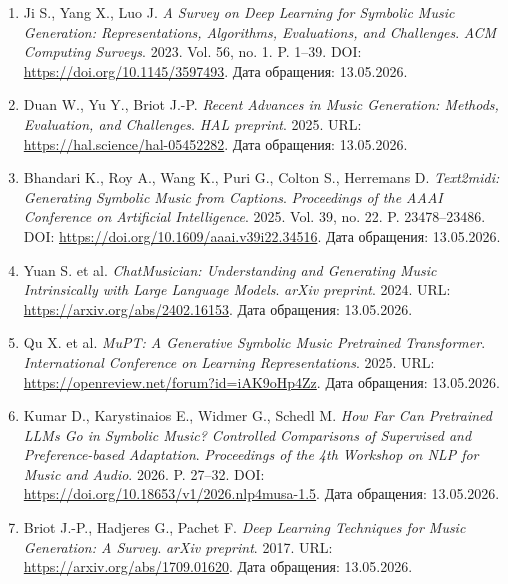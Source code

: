 \documentclass[a4paper,12pt]{extarticle}
\begin{document}
\begin{enumerate}

\item \label{ref:ji2023symbolic} Ji S., Yang X., Luo J. \textit{A Survey on Deep Learning for Symbolic Music Generation: Representations, Algorithms, Evaluations, and Challenges}. \textit{ACM Computing Surveys}. 2023. Vol. 56, no. 1. P. 1--39. DOI: \url{https://doi.org/10.1145/3597493}. Дата обращения: 13.05.2026.

\item \label{ref:duan2025recent} Duan W., Yu Y., Briot J.-P. \textit{Recent Advances in Music Generation: Methods, Evaluation, and Challenges}. \textit{HAL preprint}. 2025. URL: \url{https://hal.science/hal-05452282}. Дата обращения: 13.05.2026.

\item \label{ref:bhandari2025text2midi} Bhandari K., Roy A., Wang K., Puri G., Colton S., Herremans D. \textit{Text2midi: Generating Symbolic Music from Captions}. \textit{Proceedings of the AAAI Conference on Artificial Intelligence}. 2025. Vol. 39, no. 22. P. 23478--23486. DOI: \url{https://doi.org/10.1609/aaai.v39i22.34516}. Дата обращения: 13.05.2026.

\item \label{ref:chatmusician} Yuan S. et al. \textit{ChatMusician: Understanding and Generating Music Intrinsically with Large Language Models}. \textit{arXiv preprint}. 2024. URL: \url{https://arxiv.org/abs/2402.16153}. Дата обращения: 13.05.2026.

\item \label{ref:mupt} Qu X. et al. \textit{MuPT: A Generative Symbolic Music Pretrained Transformer}. \textit{International Conference on Learning Representations}. 2025. URL: \url{https://openreview.net/forum?id=iAK9oHp4Zz}. Дата обращения: 13.05.2026.

\item \label{ref:kumar2026far} Kumar D., Karystinaios E., Widmer G., Schedl M. \textit{How Far Can Pretrained LLMs Go in Symbolic Music? Controlled Comparisons of Supervised and Preference-based Adaptation}. \textit{Proceedings of the 4th Workshop on NLP for Music and Audio}. 2026. P. 27--32. DOI: \url{https://doi.org/10.18653/v1/2026.nlp4musa-1.5}. Дата обращения: 13.05.2026.

\item \label{ref:briot2017deep} Briot J.-P., Hadjeres G., Pachet F. \textit{Deep Learning Techniques for Music Generation: A Survey}. \textit{arXiv preprint}. 2017. URL: \url{https://arxiv.org/abs/1709.01620}. Дата обращения: 13.05.2026.


\end{enumerate}
\end{document}
